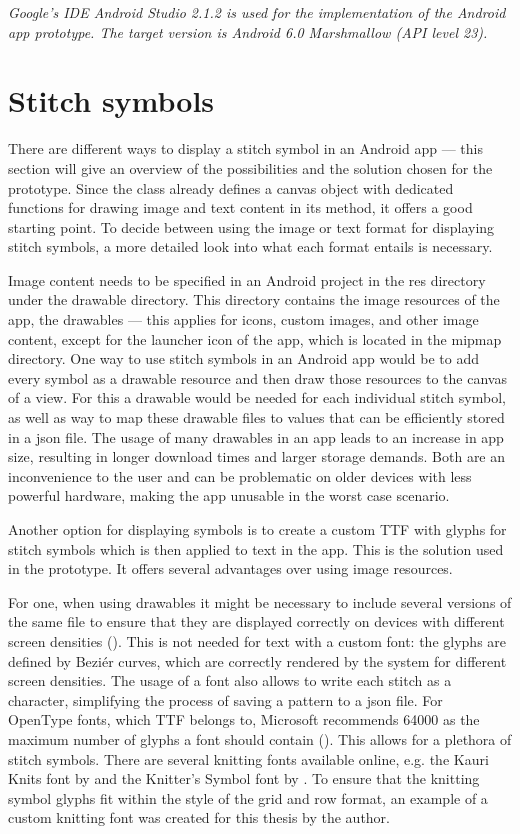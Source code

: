\textit{Google’s IDE Android Studio 2.1.2 is used for the implementation of the Android app prototype. The target version is Android 6.0 Marshmallow (\gls{API} level 23).}

\section{Stitch symbols}
There are different ways to display a stitch symbol in an Android app --- this section will give an overview of the possibilities and the solution chosen for the prototype. 
Since the  class already defines a canvas object with dedicated functions for drawing image and text content in its  method, it offers a good starting point. To decide between using the image or text format for displaying stitch symbols, a more detailed look into what each format entails is necessary.

Image content needs to be specified in an Android project in the res directory under the drawable directory. This directory contains the image resources of the app, the drawables --- this applies for icons, custom images, and other image content, except for the launcher icon of the app, which is located in the mipmap directory. One way to use stitch symbols in an Android app would be to add every symbol as a drawable resource and then draw those resources to the canvas of a view. For this a drawable would be needed for each individual stitch symbol, as well as way to map these drawable files to values that can be efficiently stored in a \gls{json} file. The usage of many drawables in an app leads to an increase in app size, resulting in longer download times and larger storage demands. Both are an inconvenience to the user and can be problematic on older devices with less powerful hardware, making the app unusable in the worst case scenario.

Another option for displaying symbols is to create a custom \gls{TTF} with glyphs for stitch symbols which is then applied to text in the app. This is the solution used in the prototype. It offers several advantages over using image resources. 

For one, when using drawables it might be necessary to include several versions of the same file to ensure that they are displayed correctly on devices with different screen densities (\cite{android_screen_densities}). This is not needed for text with a custom font: the glyphs are defined by Beziér curves, which are correctly rendered by the system for different screen densities. The usage of a font also allows to write each stitch as a character, simplifying the process of saving a pattern to a \gls{json} file. For OpenType fonts, which \gls{TTF} belongs to, Microsoft recommends 64000 as the maximum number of glyphs a font should contain (\cite{microsoft_max_glyphs}). This allows for a plethora of stitch symbols. There are several knitting fonts available online, e.g. the Kauri Knits font by \cite{kauri} and the Knitter's Symbol font by \cite{xenakis}. To ensure that the knitting symbol glyphs fit within the style of the grid and row format, an example of a custom knitting font was created for this thesis by the author.

